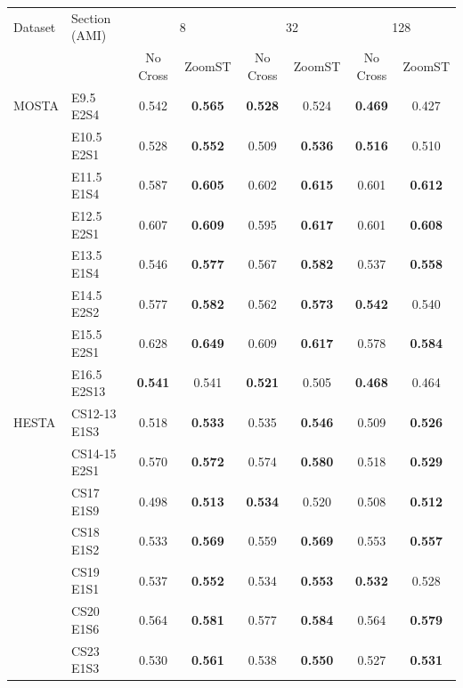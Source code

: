 \begin{tabular}{llcccccc}
\toprule
Dataset & Section (AMI) & \multicolumn{2}{c}{8} & \multicolumn{2}{c}{32} & \multicolumn{2}{c}{128} \\
 & & No Cross & ZoomST & No Cross & ZoomST & No Cross & ZoomST \\
\midrule
MOSTA & E9.5 E2S4 & 0.542 & \textbf{0.565} & \textbf{0.528} & 0.524 & \textbf{0.469} & 0.427 \\
 & E10.5 E2S1 & 0.528 & \textbf{0.552} & 0.509 & \textbf{0.536} & \textbf{0.516} & 0.510 \\
 & E11.5 E1S4 & 0.587 & \textbf{0.605} & 0.602 & \textbf{0.615} & 0.601 & \textbf{0.612} \\
 & E12.5 E2S1 & 0.607 & \textbf{0.609} & 0.595 & \textbf{0.617} & 0.601 & \textbf{0.608} \\
 & E13.5 E1S4 & 0.546 & \textbf{0.577} & 0.567 & \textbf{0.582} & 0.537 & \textbf{0.558} \\
 & E14.5 E2S2 & 0.577 & \textbf{0.582} & 0.562 & \textbf{0.573} & \textbf{0.542} & 0.540 \\
 & E15.5 E2S1 & 0.628 & \textbf{0.649} & 0.609 & \textbf{0.617} & 0.578 & \textbf{0.584} \\
 & E16.5 E2S13 & \textbf{0.541} & 0.541 & \textbf{0.521} & 0.505 & \textbf{0.468} & 0.464 \\
\midrule
HESTA & CS12-13 E1S3 & 0.518 & \textbf{0.533} & 0.535 & \textbf{0.546} & 0.509 & \textbf{0.526} \\
 & CS14-15 E2S1 & 0.570 & \textbf{0.572} & 0.574 & \textbf{0.580} & 0.518 & \textbf{0.529} \\
 & CS17 E1S9 & 0.498 & \textbf{0.513} & \textbf{0.534} & 0.520 & 0.508 & \textbf{0.512} \\
 & CS18 E1S2 & 0.533 & \textbf{0.569} & 0.559 & \textbf{0.569} & 0.553 & \textbf{0.557} \\
 & CS19 E1S1 & 0.537 & \textbf{0.552} & 0.534 & \textbf{0.553} & \textbf{0.532} & 0.528 \\
 & CS20 E1S6 & 0.564 & \textbf{0.581} & 0.577 & \textbf{0.584} & 0.564 & \textbf{0.579} \\
 & CS23 E1S3 & 0.530 & \textbf{0.561} & 0.538 & \textbf{0.550} & 0.527 & \textbf{0.531} \\
\bottomrule
\end{tabular}
